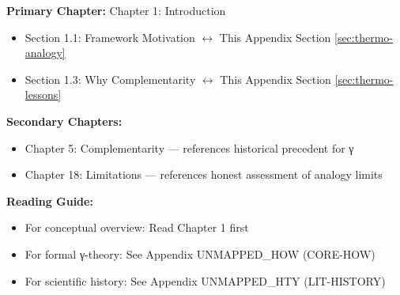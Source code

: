 %
%

%
%
%
%

\begin{tcolorbox}[colback=purple!5!white, colframe=purple!75!black,
    title=Chapter Linkage]

\textbf{Primary Chapter:} Chapter 1: Introduction
\begin{itemize}[nosep]
\item Section 1.1: Framework Motivation $\leftrightarrow$ This Appendix Section \ref{sec:thermo-analogy}
\item Section 1.3: Why Complementarity $\leftrightarrow$ This Appendix Section \ref{sec:thermo-lessons}
\end{itemize}

\textbf{Secondary Chapters:}
\begin{itemize}[nosep]
\item Chapter 5: Complementarity --- references historical precedent for γ
\item Chapter 18: Limitations --- references honest assessment of analogy limits
\end{itemize}

\textbf{Reading Guide:}
\begin{itemize}[nosep]
\item For conceptual overview: Read Chapter 1 first
\item For formal γ-theory: See Appendix UNMAPPED_HOW (CORE-HOW)
\item For scientific history: See Appendix UNMAPPED_HTY (LIT-HISTORY)
\end{itemize}

\end{tcolorbox}

